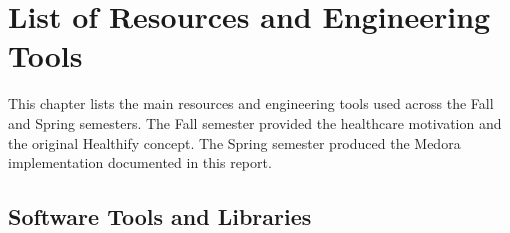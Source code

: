 
\chapter{List of Resources and Engineering Tools}
\label{chapter:List_of_Resources_and_Engineering_Tools}

This chapter lists the main resources and engineering tools used across the Fall and Spring semesters. The Fall semester provided the healthcare motivation and the original Healthify concept. The Spring semester produced the Medora implementation documented in this report.

\section{Software Tools and Libraries}

